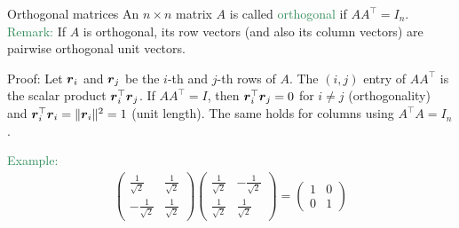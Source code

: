 \documentclass[11pt,aspectratio=169]{beamer}
\begin{document}
\begin{frame}{Orthogonal matrices}
An $n \times n$ matrix $A$ is called \textcolor{SeaGreen}{orthogonal} if  $AA^\top=I_n$.
\vskip 12pt
\textcolor{SeaGreen}{Remark:} If $A$ is orthogonal, its row vectors (and also its column vectors) are pairwise orthogonal unit vectors.

\begin{small}Proof: Let $\boldsymbol r_i$ and $\boldsymbol r_j$ be the $i$-th and $j$-th rows of $A$.  
The $(i,j)$ entry of $AA^\top$ is the scalar product $\boldsymbol r_i^\top\boldsymbol r_j$.  
If $AA^\top=I$, then $\boldsymbol r_i^\top\boldsymbol r_j = 0$ for $i\neq j$ (orthogonality) and  
$\boldsymbol r_i^\top\boldsymbol r_i = \|\boldsymbol r_i\|^2 = 1$ (unit length).  
The same holds for columns using $A^\top A = I_n$.\end{small}
\vskip 12pt
\textcolor{SeaGreen}{Example:}
\begin{align*}
\begin{pmatrix}\tfrac{1}{\sqrt{2}}& \tfrac{1}{\sqrt{2}} \\
-\tfrac{1}{\sqrt{2}}& \tfrac{1}{\sqrt{2}}
\end{pmatrix}
\begin{pmatrix}
\tfrac{1}{\sqrt{2}}& -\tfrac{1}{\sqrt{2}}\\
\tfrac{1}{\sqrt{2}}& \tfrac{1}{\sqrt{2}}
\end{pmatrix}
=
\begin{pmatrix}1&  0\\
0 & 1
\end{pmatrix}
\end{align*}
\end{frame}
\end{document}
